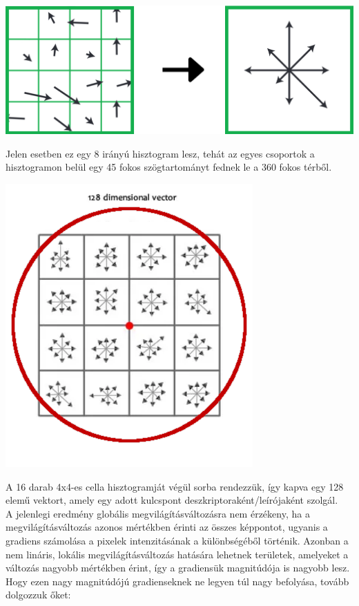 \documentclass[12pt]{report}
\begin{document}
\begin{enumerate}
\begin{enumerate}
                                    \begin{center}
                                        \includegraphics[scale=0.2]{descriptor_histogram_2.png}
                                    \end{center}
                                    Jelen esetben ez egy 8 irányú hisztogram lesz, tehát az egyes csoportok a hisztogramon belül egy 45 fokos szögtartományt fednek le a 360 fokos térből.\\
                                    \begin{center}
                                        \includegraphics[scale=0.5]{descriptor_weighted.png}
                                    \end{center}
                                    A 16 darab 4x4-es cella hisztogramját végül sorba rendezzük, így kapva egy 128 elemű vektort, amely egy adott kulcspont deszkriptoraként/leírójaként szolgál.\\
                                    A jelenlegi eredmény globális megvilágításváltozásra nem érzékeny, ha a megvilágításváltozás azonos mértékben érinti az összes képpontot, ugyanis a gradiens számolása a pixelek intenzitásának a különbségéből történik. Azonban a nem lináris, lokális megvilágításváltozás hatására lehetnek területek, amelyeket a változás nagyobb mértékben érint, így a gradiensük magnitúdója is nagyobb lesz. Hogy ezen nagy magnitúdójú gradienseknek ne legyen túl nagy befolyása, tovább dolgozzuk őket:

\end{enumerate}
\end{enumerate}
\end{document}
